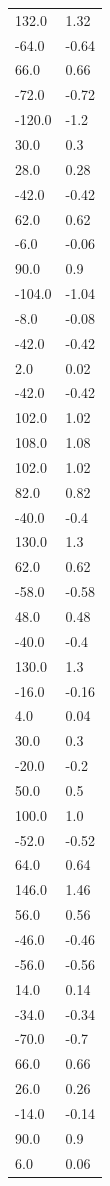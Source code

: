 \begin{longtable}{ll}
132.0 & 1.32 \\
-64.0 & -0.64 \\
66.0 & 0.66 \\
-72.0 & -0.72 \\
-120.0 & -1.2 \\
30.0 & 0.3 \\
28.0 & 0.28 \\
-42.0 & -0.42 \\
62.0 & 0.62 \\
-6.0 & -0.06 \\
90.0 & 0.9 \\
-104.0 & -1.04 \\
-8.0 & -0.08 \\
-42.0 & -0.42 \\
2.0 & 0.02 \\
-42.0 & -0.42 \\
102.0 & 1.02 \\
108.0 & 1.08 \\
102.0 & 1.02 \\
82.0 & 0.82 \\
-40.0 & -0.4 \\
130.0 & 1.3 \\
62.0 & 0.62 \\
-58.0 & -0.58 \\
48.0 & 0.48 \\
-40.0 & -0.4 \\
130.0 & 1.3 \\
-16.0 & -0.16 \\
4.0 & 0.04 \\
30.0 & 0.3 \\
-20.0 & -0.2 \\
50.0 & 0.5 \\
100.0 & 1.0 \\
-52.0 & -0.52 \\
64.0 & 0.64 \\
146.0 & 1.46 \\
56.0 & 0.56 \\
-46.0 & -0.46 \\
-56.0 & -0.56 \\
14.0 & 0.14 \\
-34.0 & -0.34 \\
-70.0 & -0.7 \\
66.0 & 0.66 \\
26.0 & 0.26 \\
-14.0 & -0.14 \\
90.0 & 0.9 \\
6.0 & 0.06 \\

\end{longtable}
